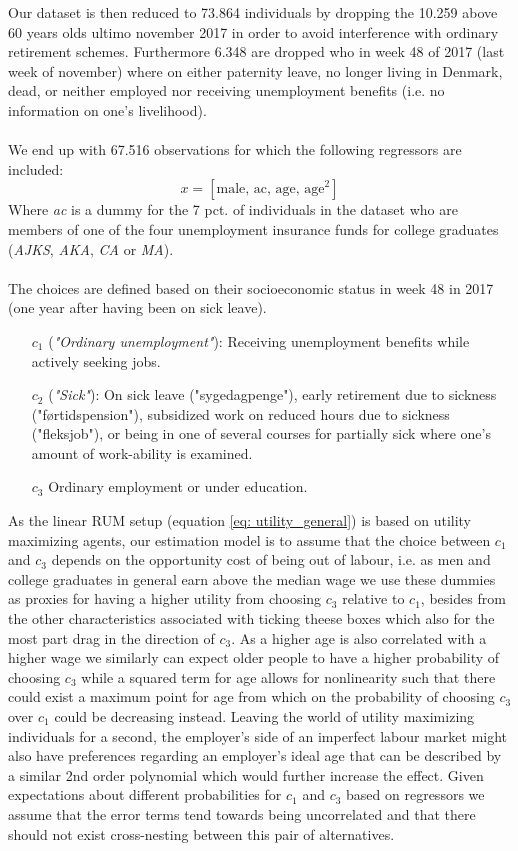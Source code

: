 Our dataset is then reduced to 73.864 individuals by dropping the 10.259 above 60 years olds ultimo november 2017 in order to avoid interference with ordinary retirement schemes. Furthermore 6.348 are dropped who in week 48 of 2017 (last week of november) where on either paternity leave, no longer living in Denmark, dead, or neither employed nor receiving unemployment benefits (i.e. no information on one's livelihood).
\\ \\
We end up with 67.516 observations for which the following regressors are included:
  \begin{equation} \label{eq: DREAM_regressors}
    x = \left[\textrm{male, ac, age, age}^2\right]
  \end{equation}
Where \textit{ac} is a dummy for the 7 pct. of individuals in the dataset who are members of one of the four unemployment insurance funds for college graduates (\textit{AJKS}, \textit{AKA}, \textit{CA} or \textit{MA}).
\\ \\
The choices are defined based on their socioeconomic status in week 48 in 2017 (one year after having been on sick leave).
  \begin{itemize}
    \item[$c_1$] (\textit{"Ordinary unemployment"}): Receiving unemployment benefits while actively seeking jobs.
    \item[$c_2$] (\textit{"Sick"}): On sick leave ("sygedagpenge"), early retirement due to sickness ("førtidspension"), subsidized work on reduced hours due to sickness ("fleksjob"), or being in one of several courses for partially sick where one's amount of work-ability is examined.
    \item[$c_3$] Ordinary employment or under education.
  \end{itemize}
As the linear RUM setup (equation \ref{eq: utility_general}) is based on utility maximizing agents, our estimation model is to assume that the choice between $c_1$ and $c_3$ depends on the opportunity cost of being out of labour, i.e. as men and college graduates in general earn above the median wage we use these dummies as proxies for having a higher utility from choosing $c_3$ relative to $c_1$, besides from the other characteristics associated with ticking theese boxes which also for the most part drag in the direction of $c_3$. As a higher age is also correlated with a higher wage we similarly can expect older people to have a higher probability of choosing $c_3$ while a squared term for age allows for nonlinearity such that there could exist a maximum point for age from which on the probability of choosing $c_3$ over $c_1$ could be decreasing instead. Leaving the world of utility maximizing individuals for a second, the employer's side of an imperfect labour market might also have preferences regarding an employer's ideal age that can be described by a similar 2nd order polynomial which would further increase the effect. Given expectations about different probabilities for $c_1$ and $c_3$ based on regressors we assume that the error terms tend towards being uncorrelated and that there should not exist cross-nesting between this pair of alternatives.

